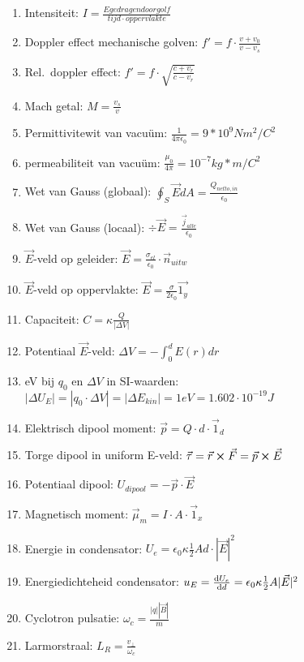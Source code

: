\documentclass[12pt]{article}
\begin{document}
    \begin{enumerate}
	    \item Intensiteit: $ I = \frac{E gedragen door golf}{tijd \cdot oppervlakte}$ 
	    \item Doppler effect mechanische golven: $ f' = f \cdot \frac{v+v_0}{v-v_s}$
	    \item Rel.\ doppler effect: $ f' = f \cdot \sqrt{\frac{c+v_r}{c-v_r}} $
	    \item Mach getal:  $ M = \frac{v_s}{v} $
	    \item Permittivitewit van vacu\"um: $ \frac{1}{4\pi\epsilon_0} = 9* 10^9 Nm^2/C^2 $
	    \item permeabiliteit van vacu\"um: $ \frac{\mu_0}{4\pi} = 10^{-7} kg*m/C^2 $
	    \item Wet van Gauss (globaal): $ \oint_S \vec{E} dA = \frac{Q_{netto,in}}{\epsilon_0} $
	    \item Wet van Gauss (locaal): $ \div \vec{E} = \frac{ \vec{j}_{alle}}{\epsilon_0} $
	    \item $ \vec{E}$-veld op geleider: $ \vec{E} = \frac{\sigma_{el}}{\epsilon_0} \cdot \vec{n}_{uitw} $
	    \item $ \vec{E}$-veld op oppervlakte: $ \vec{E} = \frac{\sigma}{2 \epsilon_0} \vec{1_y} $
	    \item Capaciteit: $ C = \kappa \frac{Q}{|\Delta V|} $
	    \item Potentiaal $ \vec{E}$-veld: $ \Delta V = -\int_0^d E(r) dr $
	    \item eV bij $q_0$ en $\Delta V$ in SI-waarden:  $|\Delta U_E| = |q_0 \cdot \Delta V| = |\Delta E_{kin}| = 1 eV = 1.602 \cdot 10^{-19} J $
	    \item Elektrisch dipool moment: $ \vec{p} = Q \cdot d \cdot \vec{1}_d $
	    \item Torge dipool in uniform E-veld: $ \vec{\tau} = \vec{r}\cross\vec{F} = \vec{p} \cross \vec{E} $
	    \item Potentiaal dipool: $ U_{dipool} = - \vec{p} \cdot \vec{E} $
	    \item Magnetisch moment: $ \vec{\mu}_m = I \cdot A \cdot \vec{1}_x $
	    \item Energie in condensator: $ U_e = \epsilon_0 \kappa \frac{1}{2} A d \cdot |\vec{E}|^2 $
	    \item Energiedichteheid condensator: $ u_E = \dv{U_e}{d} = \epsilon_0 \kappa \frac{1}{2} A |\vec{E}|^2 $
	    \item Cyclotron pulsatie: $ \omega_c = \frac{|q||\vec{B}|}{m} $
	    \item Larmorstraal: $ L_R = \frac{v_{\perp}}{\omega_c} $

\end{enumerate}
\end{document}
